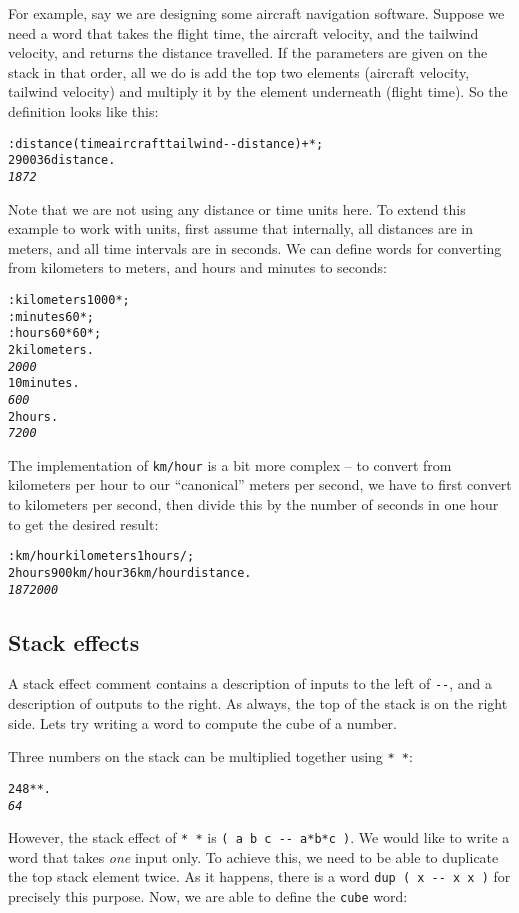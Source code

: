 \documentclass[english]{article}
\begin{document}
For example, say we are designing some aircraft
navigation software. Suppose we need a word that takes the flight time, the aircraft
velocity, and the tailwind velocity, and returns the distance travelled.
If the parameters are given on the stack in that order, all we do
is add the top two elements (aircraft velocity, tailwind velocity)
and multiply it by the element underneath (flight time). So the definition
looks like this:

\begin{alltt}
: distance ( time aircraft tailwind -{}- distance ) + {*} ;
2 900 36 distance .
\emph{1872}
\end{alltt}

Note that we are not using any distance or time units here. To extend this example to work with units, first assume that internally, all distances are
in meters, and all time intervals are in seconds. We can define words
for converting from kilometers to meters, and hours and minutes to
seconds:

\begin{alltt}
: kilometers 1000 {*} ;
: minutes 60 {*} ;
: hours 60 {*} 60 {*} ;
2 kilometers .
\emph{2000}
10 minutes .
\emph{600}
2 hours .
\emph{7200}
\end{alltt}

The implementation of \texttt{km/hour} is a bit more complex -- to convert from kilometers per hour to our ``canonical'' meters per second, we have to first convert to kilometers per second, then divide this by the number of seconds in one hour to get the desired result:

\begin{alltt}
: km/hour kilometers 1 hours / ;
2 hours 900 km/hour 36 km/hour distance .
\emph{1872000}
\end{alltt}

\subsection{Stack effects}

A stack effect comment contains a description of inputs to the left
of \texttt{-{}-}, and a description of outputs to the right. As always,
the top of the stack is on the right side. Lets try writing a word
to compute the cube of a number.

Three numbers on the stack can be multiplied together using \texttt{{*}
{*}}:

\begin{alltt}
2 4 8 {*} {*} .
\emph{64}
\end{alltt}
However, the stack effect of \texttt{{*} {*}} is \texttt{( a b c -{}-
a{*}b{*}c )}. We would like to write a word that takes \emph{one} input
only. To achieve this, we need to be able to duplicate the top stack
element twice. As it happens, there is a word \texttt{dup ( x -{}-
x x )} for precisely this purpose. Now, we are able to define the
\texttt{cube} word:
\end{document}
